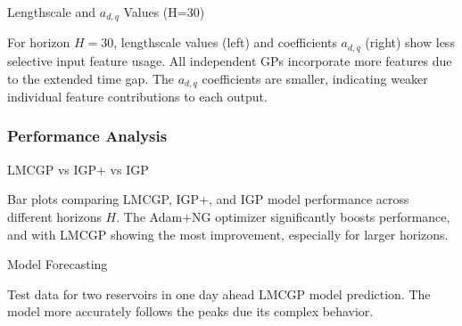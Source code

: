 \begin{frame}{Lengthscale and $a_{d,q}$ Values (H=30)}
	\begin{figure}[htbp]
		\setlength{} 
		\setlength{}
		\subfloat[]{}\hspace{-0.8em}
		\subfloat[]{}
	\end{figure}
	\vspace{-2.0em}
	\begin{block}{}
		For horizon $H=30$, lengthscale values (left) and coefficients $a_{d,q}$ (right) show less selective input feature usage. All independent GPs incorporate more features due to the extended time gap. The $a_{d,q}$ coefficients are smaller, indicating weaker individual feature contributions to each output.
	\end{block}
	

\end{frame}

\subsubsection{Performance Analysis}

\begin{frame}{LMCGP vs IGP+ vs IGP}
	\begin{figure}[htbp]
		\centering
		\setlength{}
		\setlength{}
		
		\subfloat[NLPD]{}
		\hfill
		\subfloat[MSLL]{}
		
	\end{figure}
	\vspace{-2.0em}
	\begin{block}{}
		Bar plots comparing LMCGP, IGP+, and IGP model performance across different horizons \(H\). The Adam+NG optimizer significantly boosts performance, and with LMCGP showing the most improvement, especially for larger horizons.
	\end{block}
	
	
\end{frame}

\begin{frame}{Model Forecasting}
	\centering
	\begin{figure}[htbp]
	\tiny
	\setlength{} 
	\setlength{}

	\subfloat[$A$.]{}
	\subfloat[$I$.]{}
	\end{figure}
	\vspace{-1.5em}
	\begin{block}{}
		Test data for two reservoirs in one day ahead LMCGP model prediction. The model more accurately follows the peaks due its complex behavior.
	\end{block}
\end{frame}



